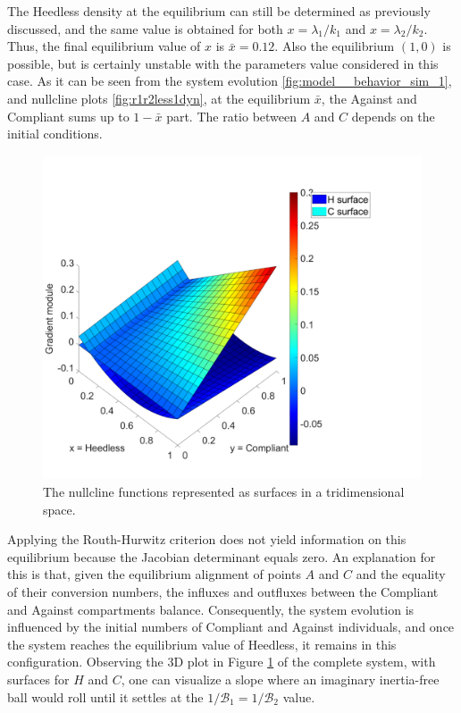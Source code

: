 The Heedless density at the equilibrium can still be determined as previously discussed, and the same value is obtained for both $x = \lambda_1/k_1$ and $x = \lambda_2/k_2$. Thus, the final equilibrium value of $x$ is $\bar{x} = 0.12$.
Also the equilibrium $(1,0)$ is possible, but is certainly unstable with the parameters value considered in this case. As it can be seen from the system evolution \eqref{fig:model__behavior_sim_1}, and nullcline plots \eqref{fig:r1r2less1dyn}, at the equilibrium $\bar{x}$, the Against and Compliant  sums up to $1 - \bar{x}$ part. The ratio between $A$ and $C$ depends on the initial conditions.
\begin{figure}[h]
	\centering
	\includegraphics[width=0.7\linewidth]{1_corpo/figure/behavioural_equilibrium/Surface_nullcline_B1_equal_B2}
	\caption[Surface nullcline]{The nullcline functions represented as surfaces in a tridimensional space.}
	\label{fig:surfacenullclineb1equalb2}
\end{figure}
Applying the Routh-Hurwitz criterion does not yield information on this equilibrium because the Jacobian determinant equals zero. An explanation for this is that, given the equilibrium alignment of points $A$ and $C$ and the equality of their conversion numbers, the influxes and outfluxes between the Compliant and Against compartments balance. Consequently, the system evolution is influenced by the initial numbers of Compliant and Against individuals, and once the system reaches the equilibrium value of Heedless, it remains in this configuration. Observing the 3D plot in Figure \ref{fig:surfacenullclineb1equalb2} of the complete system, with surfaces for $H$ and $C$, one can visualize a slope where an imaginary inertia-free ball would roll until it settles at the $1/\mathcal{B}_1 = 1/\mathcal{B}_2$  value.\\


